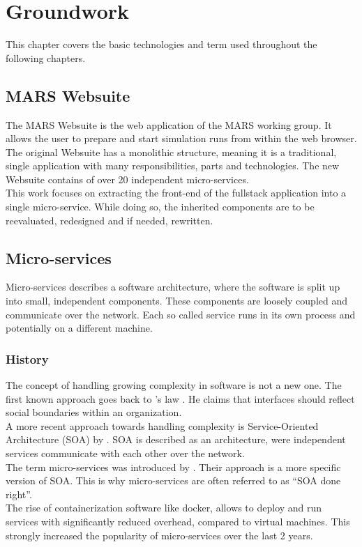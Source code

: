 
\chapter{Groundwork}
This chapter covers the basic technologies and term used throughout the following chapters.



\section{MARS Websuite}
The MARS Websuite is the web application of the MARS working group. It allows the user to prepare and start simulation runs from within the web browser.\\
The original Websuite has a monolithic structure, meaning it is a traditional, single application with many responsibilities, parts and technologies. The new Websuite contains of over 20 independent micro-services.\\
This work focuses on extracting the front-end of the fullstack application into a single micro-service. While doing so, the inherited components are to be reevaluated, redesigned and if needed, rewritten.



\section{Micro-services}
\label{sec:micro-services}
Micro-services describes a software architecture, where the software is split up into small, independent components. These components are loosely coupled and communicate over the network. Each so called service runs in its own process and potentially on a different machine.


\subsection{History}
The concept of handling growing complexity in software is not a new one. The first known approach goes back to \citeauthor{conway1968committees}'s law \citeyearpar{conway1968committees}. He claims that interfaces should reflect social boundaries within an organization.\\
A more recent approach towards handling complexity is Service-Oriented Architecture (SOA) by \cite{as2005service}. SOA is described as an architecture, were independent services communicate with each other over the network.\\
The term micro-services was introduced by \cite{martinfowler2014microservices}. Their approach is a more specific version of SOA. This is why micro-services are often referred to as \enquote{SOA done right}.\\
The rise of containerization software like docker, allows to deploy and run services with significantly reduced overhead, compared to virtual machines. This strongly increased the popularity of micro-services over the last 2 years.


